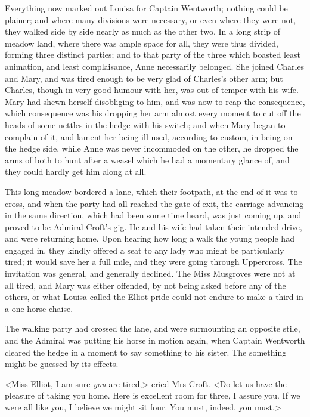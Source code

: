 Everything now marked out Louisa for Captain Wentworth; nothing could be plainer; and where many divisions were necessary, or even where they were not, they walked side by side nearly as much as the other two. In a long strip of meadow land, where there was ample space for all, they were thus divided, forming three distinct parties; and to that party of the three which boasted least animation, and least complaisance, Anne necessarily belonged. She joined Charles and Mary, and was tired enough to be very glad of Charles's other arm; but Charles, though in very good humour with her, was out of temper with his wife. Mary had shewn herself disobliging to him, and was now to reap the consequence, which consequence was his dropping her arm almost every moment to cut off the heads of some nettles in the hedge with his switch; and when Mary began to complain of it, and lament her being ill-used, according to custom, in being on the hedge side, while Anne was never incommoded on the other, he dropped the arms of both to hunt after a weasel which he had a momentary glance of, and they could hardly get him along at all.

This long meadow bordered a lane, which their footpath, at the end of it was to cross, and when the party had all reached the gate of exit, the carriage advancing in the same direction, which had been some time heard, was just coming up, and proved to be Admiral Croft's gig. He and his wife had taken their intended drive, and were returning home. Upon hearing how long a walk the young people had engaged in, they kindly offered a seat to any lady who might be particularly tired; it would save her a full mile, and they were going through Uppercross. The invitation was general, and generally declined. The Miss Musgroves were not at all tired, and Mary was either offended, by not being asked before any of the others, or what Louisa called the Elliot pride could not endure to make a third in a one horse chaise.

The walking party had crossed the lane, and were surmounting an opposite stile, and the Admiral was putting his horse in motion again, when Captain Wentworth cleared the hedge in a moment to say something to his sister. The something might be guessed by its effects.

<Miss Elliot, I am sure \textit{you} are tired,> cried Mrs Croft. <Do let us have the pleasure of taking you home. Here is excellent room for three, I assure you. If we were all like you, I believe we might sit four. You must, indeed, you must.>

